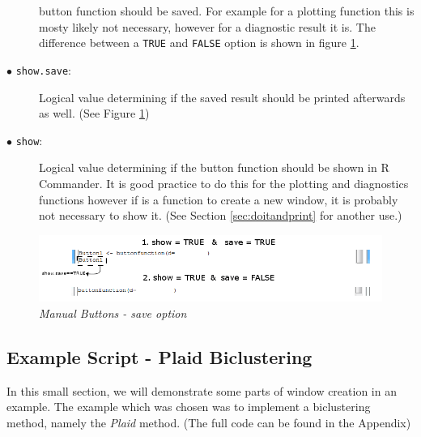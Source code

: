 \documentclass[a4paper]{article}\usepackage[]{graphicx}\usepackage[]{color}
\begin{document}
\begin{description}
  button function should be saved. For example for a plotting function this is
  mosty likely not necessary, however for a diagnostic result it is. The
  difference between a \verb|TRUE| and \verb|FALSE| option is shown in figure
  \ref{manualbutton_showsave}.
  \item[$\bullet$ \texttt{show.save}:] Logical value determining if the saved
  result should be printed afterwards as well. (See Figure \ref{manualbutton_showsave})
  \item[$\bullet$ \texttt{show}:] Logical value determining if the button
  function should be shown in R Commander. It is good practice to do this for
  the plotting and diagnostics functions however if is a function to create a
  new window, it is probably not necessary to show it. (See Section
  \ref{sec:doitandprint} for another use.)

\end{description}


\begin{figure}[H]
\centering
\includegraphics[scale=0.5]{figures/manualbutton_showsave.png}
\caption{{\it Manual Buttons - save option}
\label{manualbutton_showsave}}
\end{figure}

\subsection{Example Script - Plaid Biclustering}
In this small section, we will demonstrate some parts of window creation in an
example. The example which was chosen was to implement a biclustering method,
namely the {\it Plaid} method. (The full code can be found in the Appendix)
\end{document}
